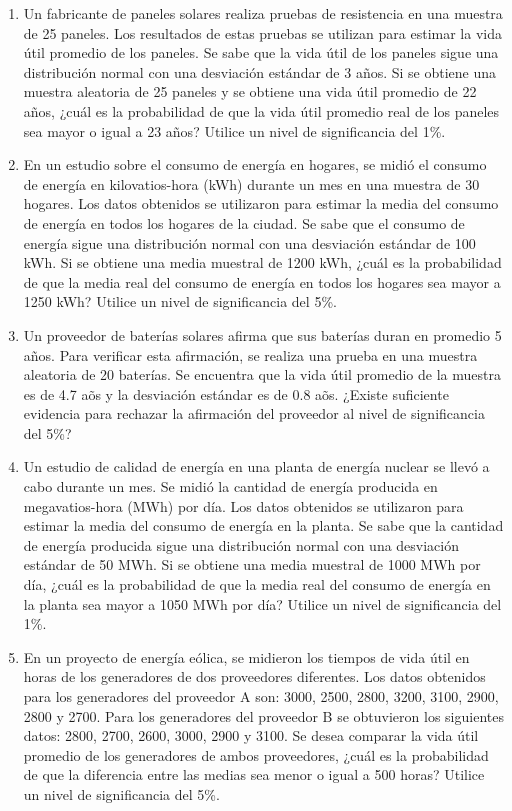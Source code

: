 \begin{Ejer}
\begin{enumerate}
\item Un fabricante de paneles solares realiza pruebas de resistencia en una muestra de 25 paneles. Los resultados de estas pruebas se utilizan para estimar la vida \'util promedio de los paneles. Se sabe que la vida \'util de los paneles sigue una distribuci\'on normal con una desviaci\'on est\'andar de 3 a\~nos. Si se obtiene una muestra aleatoria de 25 paneles y se obtiene una vida \'util promedio de 22 a\~nos, ¿cu\'al es la probabilidad de que la vida \'util promedio real de los paneles sea mayor o igual a 23 a\~nos? Utilice un nivel de significancia del 1\%.

\item En un estudio sobre el consumo de energ\'ia en hogares, se midi\'o el consumo de energ\'ia en kilovatios-hora (kWh) durante un mes en una muestra de 30 hogares. Los datos obtenidos se utilizaron para estimar la media del consumo de energ\'ia en todos los hogares de la ciudad. Se sabe que el consumo de energ\'ia sigue una distribuci\'on normal con una desviaci\'on est\'andar de 100 kWh. Si se obtiene una media muestral de 1200 kWh, ¿cu\'al es la probabilidad de que la media real del consumo de energ\'ia en todos los hogares sea mayor a 1250 kWh? Utilice un nivel de significancia del 5\%.

\item Un proveedor de bater\'ias solares afirma que sus bater\'ias duran en promedio 5 a\~nos. Para verificar esta afirmaci\'on, se realiza una prueba en una muestra aleatoria de 20 bater\'ias. Se encuentra que la vida \'util promedio de la muestra es de 4.7 a\~os y la desviaci\'on est\'andar es de 0.8 a\~os. ¿Existe suficiente evidencia para rechazar la afirmaci\'on del proveedor al nivel de significancia del 5\%?

\item Un estudio de calidad de energ\'ia en una planta de energ\'ia nuclear se llev\'o a cabo durante un mes. Se midi\'o la cantidad de energ\'ia producida en megavatios-hora (MWh) por d\'ia. Los datos obtenidos se utilizaron para estimar la media del consumo de energ\'ia en la planta. Se sabe que la cantidad de energ\'ia producida sigue una distribuci\'on normal con una desviaci\'on est\'andar de 50 MWh. Si se obtiene una media muestral de 1000 MWh por d\'ia, ¿cu\'al es la probabilidad de que la media real del consumo de energ\'ia en la planta sea mayor a 1050 MWh por d\'ia? Utilice un nivel de significancia del 1\%.

\item En un proyecto de energ\'ia e\'olica, se midieron los tiempos de vida \'util en horas de los generadores de dos proveedores diferentes. Los datos obtenidos para los generadores del proveedor A son: 3000, 2500, 2800, 3200, 3100, 2900, 2800 y 2700. Para los generadores del proveedor B se obtuvieron los siguientes datos: 2800, 2700, 2600, 3000, 2900 y 3100. Se desea comparar la vida \'util promedio de los generadores de ambos proveedores, ¿cu\'al es la probabilidad de que la diferencia entre las medias sea menor o igual a 500 horas? Utilice un nivel de significancia del 5\%.


\end{enumerate}
\end{Ejer} 


